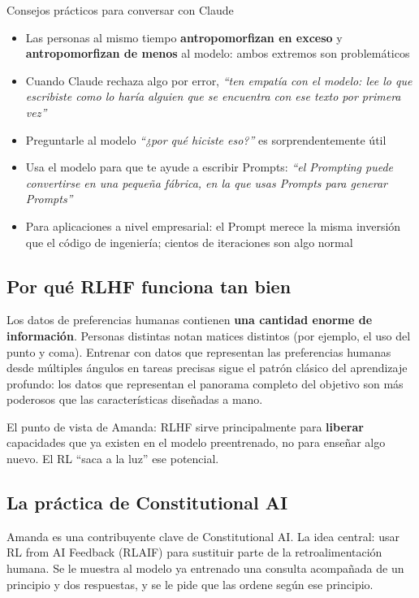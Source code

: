 \begin{knowledgebox}{Consejos prácticos para conversar con Claude}
\begin{itemize}
    \item Las personas al mismo tiempo \textbf{antropomorfizan en exceso} y \textbf{antropomorfizan de menos} al modelo: ambos extremos son problemáticos
    \item Cuando Claude rechaza algo por error, \textit{``ten empatía con el modelo: lee lo que escribiste como lo haría alguien que se encuentra con ese texto por primera vez''}
    \item Preguntarle al modelo \textit{``¿por qué hiciste eso?''} es sorprendentemente útil
    \item Usa el modelo para que te ayude a escribir Prompts: \textit{``el Prompting puede convertirse en una pequeña fábrica, en la que usas Prompts para generar Prompts''}
    \item Para aplicaciones a nivel empresarial: el Prompt merece la misma inversión que el código de ingeniería; cientos de iteraciones son algo normal
\end{itemize}
\end{knowledgebox}

\subsection{Por qué RLHF funciona tan bien}

Los datos de preferencias humanas contienen \textbf{una cantidad enorme de información}. Personas distintas notan matices distintos (por ejemplo, el uso del punto y coma). Entrenar con datos que representan las preferencias humanas desde múltiples ángulos en tareas precisas sigue el patrón clásico del aprendizaje profundo: los datos que representan el panorama completo del objetivo son más poderosos que las características diseñadas a mano.

El punto de vista de Amanda: RLHF sirve principalmente para \textbf{liberar} capacidades que ya existen en el modelo preentrenado, no para enseñar algo nuevo. El RL ``saca a la luz'' ese potencial.

\subsection{La práctica de Constitutional AI}

Amanda es una contribuyente clave de Constitutional AI. La idea central: usar RL from AI Feedback (RLAIF) para sustituir parte de la retroalimentación humana. Se le muestra al modelo ya entrenado una consulta acompañada de un principio y dos respuestas, y se le pide que las ordene según ese principio.

